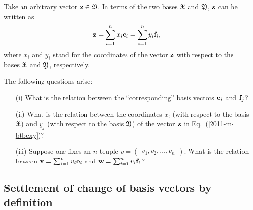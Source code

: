 Take an arbitrary vector ${\bf z}\in {\frak V}$.
In terms of the two bases
${\frak X}$ and
${\frak Y}$,
${\bf z}$ can be written as
\begin{equation}
{\bf z}=
\sum_{i=1}^n x_i{\bf e}_i
=
\sum_{i=1}^n  y_i{\bf f}_i,
\label{2011-m-btbexy}
\end{equation}
where $x_i$ and $y_i$ stand for the coordinates of the vector  ${\bf z}$
with respect to the bases ${\frak X}$ and
${\frak Y}$,
respectively.

The following questions arise:
\begin{itemize}
\item[(i)]
What is the relation between the ``corresponding'' basis vectors ${\bf e}_i$ and ${\bf f}_j$?
\item[(ii)]
What is the relation between the coordinates $x_i$ (with respect to the basis  ${\frak X}$) and $y_j$ (with respect to the basis  ${\frak Y}$)  of the vector ${\bf z}$ in Eq.~(\ref{2011-m-btbexy})?
\item[(iii)]
Suppose one fixes
an $n$-touple $v = \begin{pmatrix} v_1, v_2, \ldots , v_n \end{pmatrix}$.
What is the relation beween
${\bf v} =
\sum_{i=1}^n v_i {\bf e}_i
$
and
${\bf w}=
\sum_{i=1}^n v_i {\bf f}_i
$?
\end{itemize}

\subsection{Settlement of change of basis vectors by definition}


